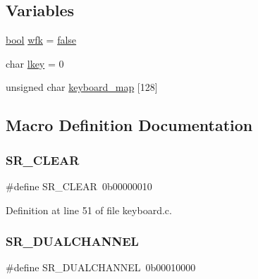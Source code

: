\subsection*{Variables}
\begin{DoxyCompactItemize}
\item 
\hyperlink{a00125_af6a258d8f3ee5206d682d799316314b1_af6a258d8f3ee5206d682d799316314b1}{bool} \hyperlink{a00038_a6ddd5223379778858edc46ffbec19775_a6ddd5223379778858edc46ffbec19775}{wfk} = \hyperlink{a00125_af6a258d8f3ee5206d682d799316314b1_af6a258d8f3ee5206d682d799316314b1ae9de385ef6fe9bf3360d1038396b884c}{false}
\item 
char \hyperlink{a00038_ade374650022cb30c4f5591a8dafad685_ade374650022cb30c4f5591a8dafad685}{lkey} = 0
\item 
unsigned char \hyperlink{a00038_a5d0b5e007d1b57bf84d1c03439810533_a5d0b5e007d1b57bf84d1c03439810533}{keyboard\+\_\+map} \mbox{[}128\mbox{]}
\end{DoxyCompactItemize}


\subsection{Macro Definition Documentation}
\mbox{\label{a00038_a8aa66e8bc828742fb4819d7cd2df598d_a8aa66e8bc828742fb4819d7cd2df598d}} 
\subsubsection{\texorpdfstring{S\+R\+\_\+\+C\+L\+E\+AR}{SR\_CLEAR}}
{\footnotesize\ttfamily \#define S\+R\+\_\+\+C\+L\+E\+AR~0b00000010}



Definition at line 51 of file keyboard.\+c.

\mbox{\label{a00038_addafe32b109f94a57ae4bf1a1dca05e0_addafe32b109f94a57ae4bf1a1dca05e0}} 
\subsubsection{\texorpdfstring{S\+R\+\_\+\+D\+U\+A\+L\+C\+H\+A\+N\+N\+EL}{SR\_DUALCHANNEL}}
{\footnotesize\ttfamily \#define S\+R\+\_\+\+D\+U\+A\+L\+C\+H\+A\+N\+N\+EL~0b00010000}



